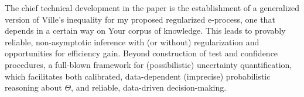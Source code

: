 \documentclass[a4paper, 12pt]{article}
\theoremstyle{plain}
\theoremstyle{definition}
\theoremstyle{remark}
\begin{document}
The chief technical development in the paper is the establishment of a generalized version of Ville's inequality for my proposed regularized e-process, one that depends in a certain way on Your corpus of knowledge.  This leads to provably reliable, non-asymptotic inference with (or without) regularization and opportunities for efficiency gain.  Beyond construction of test and confidence procedures, a full-blown framework for (possibilistic) uncertainty quantification, which facilitates both calibrated, data-dependent (imprecise) probabilistic reasoning about $\Theta$, and reliable, data-driven decision-making.  

\end{document}
